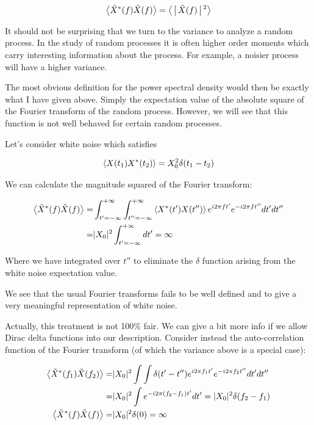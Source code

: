 \documentclass[12pt]{article}
\begin{document}
\begin{align}
\Braket{\tilde{X}^*(f)\tilde{X}(f)} = \Braket{|\tilde{X}(f)|^2}
\end{align}

It should not be surprising that we turn to the variance to analyze a random process.
In the study of random processes it is often higher order moments which carry interesting information about the process.
For example, a noisier process will have a higher variance.

The most obvious definition for the power spectral density would then be exactly what I have given above. 
Simply the expectation value of the absolute square of the Fourier transform of the random process.
However, we will see that this function is not well behaved for certain random processes.

Let's consider white noise which satisfies

\begin{align}
\Braket{X(t_1)X^*(t_2)} = X_0^2\delta(t_1-t_2)
\end{align}

We can calculate the magnitude squared of the Fourier transform:

\begin{align}
\Braket{\tilde{X}^*(f)\tilde{X}(f)} =& \int_{t'=-\infty}^{+\infty} \int_{t'' = -\infty}^{+\infty} \Braket{X^*(t')X(t'')} e^{i2\pi f t'} e^{-i2\pi f t''} dt' dt''\\
=& |X_0|^2 \int_{t'=-\infty}^{+\infty} dt' = \infty
\end{align}

Where we have integrated over $t''$ to eliminate the $\delta$ function arising from the white noise expectation value.

We see that the usual Fourier transforms fails to be well defined and to give a very meaningful representation of white noise.

Actually, this treatment is not 100\% fair.
We can give a bit more info if we allow Dirac delta functions into our description.
Consider instead the auto-correlation function of the Fourier transform (of which the variance above is a special case):

\begin{align}
\Braket{\tilde{X}^*(f_1)\tilde{X}(f_2)} =& |X_0|^2 \int \int \delta(t'-t'') e^{i2\pi f_1 t'}e^{-i2\pi f_2 t''} dt' dt''\\
=& |X_0|^2 \int e^{-i 2\pi (f_2-f_1) t'}dt' = |X_0|^2\delta(f_2-f_1)\\
\Braket{\tilde{X}^*(f)\tilde{X}(f)} =& |X_0|^2\delta(0) = \infty
\end{align}
\end{document}
